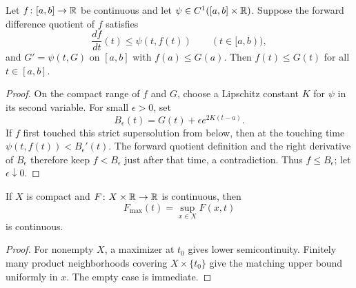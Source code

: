 \begin{lemma}
\label{lem:forward-difference-quotient}


\label{fordiffquot}




Let $f\colon[a,b]\to\mathbb{R}$ be continuous and let
$\psi\in C^1([a,b]\times\mathbb{R})$. Suppose the forward difference quotient
of $f$ satisfies
$$\frac{df}{dt}(t)\le\psi(t,f(t))\qquad(t\in[a,b)),$$
and $G'=\psi(t,G)$ on $[a,b]$ with $f(a)\le G(a)$. Then
$f(t)\le G(t)$ for all $t\in[a,b]$.
\end{lemma}
\begin{proof}
\sketch
{}

On the compact range of $f$ and $G$, choose a Lipschitz constant $K$
for $\psi$ in its second variable. For small $\epsilon>0$, set
$$B_\epsilon(t)=G(t)+\epsilon e^{2K(t-a)}.$$
If $f$ first touched this strict supersolution from below, then at the
touching time
$\psi(t,f(t))<B_\epsilon'(t)$. The forward quotient definition and the
right derivative of $B_\epsilon$ therefore keep $f<B_\epsilon$ just
after that time, a contradiction. Thus $f\le B_\epsilon$; let
$\epsilon\downarrow0$.
\end{proof}

\begin{lemma}
\label{lem:max-function-continuous-product}




If $X$ is compact and $F\colon X\times\mathbb{R}\to\mathbb{R}$ is continuous, then
$$F_{\max}(t)=\sup_{x\in X}F(x,t)$$
is continuous.
\end{lemma}
\begin{proof}
\sketch

For nonempty $X$, a maximizer at $t_0$ gives lower semicontinuity.
Finitely many product neighborhoods covering $X\times\{t_0\}$ give the
matching upper bound uniformly in $x$. The empty case is immediate.
\end{proof}

